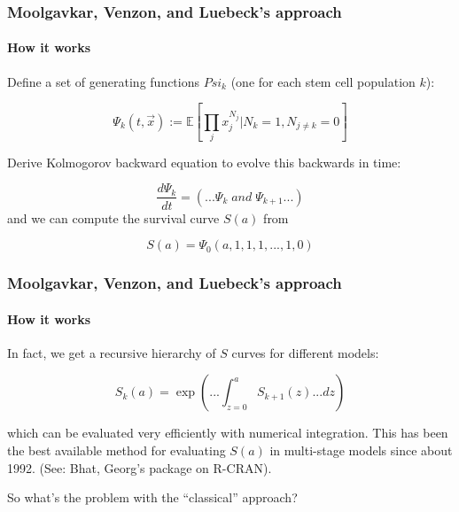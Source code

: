 \documentclass{beamer}
\begin{document}
\begin{frame}
    \frametitle{Moolgavkar, Venzon, and Luebeck's approach}
    \framesubtitle{How it works}
    Define a set of generating functions $Psi_k$ (one for each stem cell
    population $k$):

    \begin{equation}
        \Psi_k(t,\vec{x}) := \mathbb{E}\left[\prod_j x_j^{N_j}|N_k = 1, N_{j\neq k} = 0\right]
    \end{equation}

    Derive Kolmogorov backward equation to evolve this backwards in time:

    \begin{equation}
        \frac{d \Psi_k}{dt} = (... \Psi_k \; and \; \Psi_{k+1} ...)
    \end{equation}
    and we can compute the survival curve $S(a)$ from

    \begin{equation}
        S(a) = \Psi_0(a, 1, 1, 1, ..., 1, 0)
    \end{equation}
\end{frame}

\begin{frame}
    \frametitle{Moolgavkar, Venzon, and Luebeck's approach}
    \framesubtitle{How it works}
    In fact, we get a recursive hierarchy of $S$ curves for different models:

    \begin{equation}
        S_k(a) = \exp\left(... \int_{z=0}^a S_{k+1}(z) ... dz\right)
    \end{equation}

    which can be evaluated very efficiently with numerical integration. This has
    been the best available method for evaluating $S(a)$ in multi-stage models
    since about 1992. (See: Bhat, Georg's package on R-CRAN).
    
    \;

    So what's the problem with the ``classical'' approach?
\end{frame}
\end{document}
